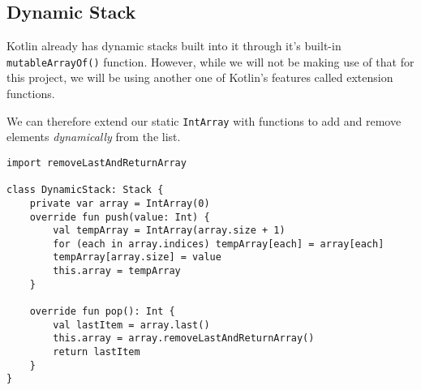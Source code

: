 \documentclass{article}
\begin{document}
\subsection{Dynamic Stack}
Kotlin already has dynamic stacks built into it through it's built-in \texttt{mutableArrayOf()} function. However, while we will not be making use of that for this project, we will be using another one of Kotlin's features called extension functions. 

We can therefore extend our static \texttt{IntArray} with functions to add and remove elements \textit{dynamically} from the list.



\begin{verbatim}
import removeLastAndReturnArray

class DynamicStack: Stack {
    private var array = IntArray(0)
    override fun push(value: Int) {
        val tempArray = IntArray(array.size + 1)
        for (each in array.indices) tempArray[each] = array[each]
        tempArray[array.size] = value
        this.array = tempArray
    }

    override fun pop(): Int {
        val lastItem = array.last()
        this.array = array.removeLastAndReturnArray()
        return lastItem
    }
}
\end{verbatim}
\end{document}
